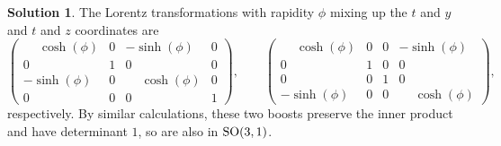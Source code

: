 \documentclass[11pt, a4paper]{report}
\theoremstyle{definition}
\newtheorem{sol}{Solution}[part]
\newcommand*{\SO}{\ensuremath\text{SO}}
\begin{document}
\begin{sol}
The Lorentz transformations with rapidity $\phi$ mixing up the $t$ and $y$ and $t$ and $z$ coordinates are
\[
    \begin{pmatrix}
        \phantom{-}\cosh(\phi) & 0 & -\sinh(\phi)           & 0 \\
        0                      & 1 & 0                      & 0 \\
        -\sinh(\phi)           & 0 & \phantom{-}\cosh(\phi) & 0 \\
        0                      & 0 & 0                      & 1
    \end{pmatrix}, \qquad
    \begin{pmatrix}
        \phantom{-}\cosh(\phi) & 0 & 0 & -\sinh(\phi) \\
        0                      & 1 & 0 & 0 \\
        0                      & 0 & 1 & 0 \\
        -\sinh(\phi)           & 0 & 0 & \phantom{-}\cosh(\phi)
    \end{pmatrix},
\]
respectively.
By similar calculations, these two boosts preserve the inner product and have determinant $1$, so are also in $\SO(3, 1)$.

\end{sol}
\end{document}

